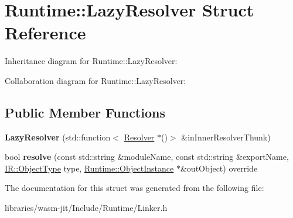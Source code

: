 \hypertarget{struct_runtime_1_1_lazy_resolver}{}\section{Runtime\+:\+:Lazy\+Resolver Struct Reference}
\label{struct_runtime_1_1_lazy_resolver}


Inheritance diagram for Runtime\+:\+:Lazy\+Resolver\+:


Collaboration diagram for Runtime\+:\+:Lazy\+Resolver\+:
\subsection*{Public Member Functions}
\begin{DoxyCompactItemize}
\item 
\mbox{\label{struct_runtime_1_1_lazy_resolver_aa5bcb6ac1a7d1042c612ec60bc30cf35}} 
{\bfseries Lazy\+Resolver} (std\+::function$<$ \mbox{\hyperlink{struct_runtime_1_1_resolver}{Resolver}} $\ast$()$>$ \&in\+Inner\+Resolver\+Thunk)
\item 
\mbox{\label{struct_runtime_1_1_lazy_resolver_a017b70308cc0fb38d2fcdbb372f74362}} 
bool {\bfseries resolve} (const std\+::string \&module\+Name, const std\+::string \&export\+Name, \mbox{\hyperlink{struct_i_r_1_1_object_type}{I\+R\+::\+Object\+Type}} type, \mbox{\hyperlink{struct_runtime_1_1_object_instance}{Runtime\+::\+Object\+Instance}} $\ast$\&out\+Object) override
\end{DoxyCompactItemize}


The documentation for this struct was generated from the following file\+:\begin{DoxyCompactItemize}
\item 
libraries/wasm-\/jit/\+Include/\+Runtime/Linker.\+h\end{DoxyCompactItemize}
